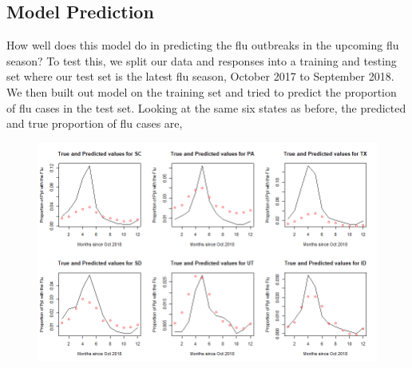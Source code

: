 \documentclass[12pt, onesided]{article}
\begin{document}
\begin{flushleft}
\section{Model Prediction}
How well does this model do in predicting the flu outbreaks in the upcoming flu season? To test this, we split our data and responses into a training and testing set where our test set is the latest flu season, October 2017 to September 2018. We then built out model on the training set and tried to predict the proportion of flu cases in the test set. Looking at the same six states as before, the predicted and true proportion of flu cases are,
\newpage
\begin{figure}[h!]
\centering
\includegraphics[scale=0.75]{TestProportionPlot}
\end{figure}


\end{flushleft}
\end{document}
